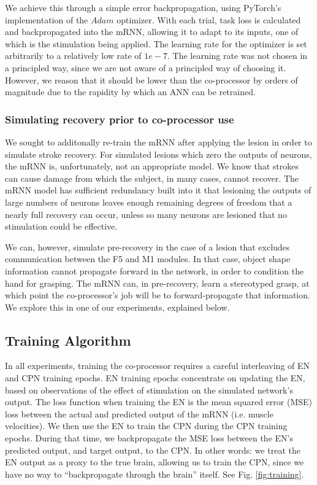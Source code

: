 \documentclass[12pt]{iopart}
\begin{document}
We achieve this through a simple error backpropagation, using PyTorch's
implementation of the $Adam$ optimizer. With each trial, task loss is
calculated and backpropagated into the mRNN, allowing it to adapt to
its inputs, one of which is the stimulation being applied. The learning
rate for the optimizer is set arbitrarily to a relatively low rate of
$1e-7$. The learning rate was not chosen in a principled way, since
we are not aware of a principled way of choosing it. However, we reason
that it should be lower than the co-processor by orders of magnitude due
to the rapidity by which an ANN can be retrained.

\subsubsection{Simulating recovery prior to co-processor use}
We sought to additonally re-train the mRNN after applying the lesion in
order to simulate stroke recovery. For simulated lesions which zero the outputs
of neurons, the mRNN is, unfortunately, not an appropriate model.
We know that strokes can cause damage from which the subject, in many cases,
cannot recover. The mRNN model has sufficient redundancy built into it that
lesioning the outputs of large numbers of neurons leaves enough remaining
degrees of freedom that a nearly full recovery can occur, unless so many
neurons are lesioned that no stimulation could be effective.

We can, however, simulate pre-recovery in the case of a lesion that excludes
communication between the F5 and M1 modules. In that case, object shape information
cannot propagate forward in the network, in order to condition the hand for
grasping. The mRNN can, in pre-recovery, learn a stereotyped grasp, at which
point the co-processor's job will be to forward-propagate that information.
We explore this in one of our experiments, explained below.

\subsection{Training Algorithm}
In all experiments, training the co-processor requires a careful interleaving of
EN and CPN training epochs. EN training epochs concentrate on updating the EN,
based on observations of the effect of stimulation on the simulated network's output.
The loss function when training the EN is the mean squared error (MSE) loss between the
actual and predicted output of the mRNN (i.e. muscle velocities). We then use the EN
to train the CPN during the CPN training epochs. During that time, we backpropagate
the MSE loss between the EN's predicted output, and target output, to the CPN. In
other words: we treat the EN output as a proxy to the true brain, allowing us
to train the CPN, since we have no way to ``backpropagate through the brain'' itself.
See Fig. \ref{fig:training}.
\end{document}
